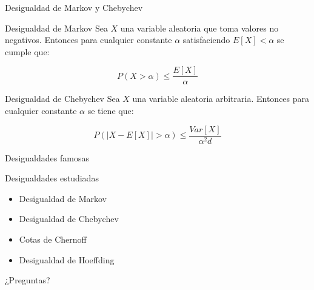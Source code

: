 \documentclass[10pt]{beamer}
\begin{document}
\begin{frame}[fragile]{Desigualdad de Markov y Chebychev}
\vspace{10px}
\pause
{}

\begin{block}{Desigualdad de Markov}
	Sea $X$ una variable aleatoria que toma valores no negativos. Entonces para cualquier constante $\alpha$ satisfaciendo $E[X]<\alpha$ se cumple que:
	
	$$P(X>\alpha)\leq \frac{E[X]}{\alpha}$$
\end{block}

\begin{block}{Desigualdad de Chebychev}
	Sea $X$ una variable aleatoria arbitraria. Entonces para cualquier constante $\alpha$ se tiene que:
	
	$$P(|X - E[X]|>\alpha)\leq \frac{Var[X]}{\alpha^2d}$$
\end{block}

\end{frame}

\begin{frame}[fragile]{Desigualdades famosas}
\vspace{10px}
\pause
{}

\begin{block}{Desigualdades estudiadas}
	\begin{itemize}
		\item Desigualdad de Markov
		\item Desigualdad de Chebychev
		\item Cotas de Chernoff
		\item Desigualdad de Hoeffding
	\end{itemize}
\end{block}

\end{frame}

\begin{frame}[standout]
	\LARGE{¿Preguntas?}
	\vspace{10px}
\end{frame}
\end{document}
